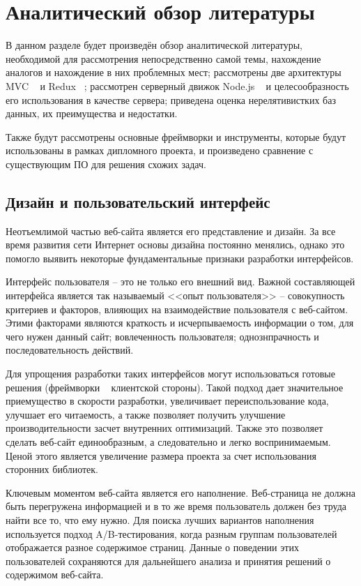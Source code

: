 \section{Аналитический обзор литературы}
\label{sec:domain}

В данном разделе будет произведён обзор аналитической литературы, необходимой для рассмотрения непосредственно самой темы, нахождение аналогов и нахождение в них проблемных мест; рассмотрены две архитектуры MVC ~\cite{mvc} и Redux ~\cite{redux}; рассмотрен серверный движок Node.js ~\cite{node_js} и целесообразность его использования в качестве сервера; приведена оценка нерелятивистких баз данных, их преимущества и недостатки.

Также будут рассмотрены основные фреймворки и инструменты, которые будут использованы в рамках дипломного проекта, и произведено сравнение с существующим ПО для решения схожих задач.

\subsection{Дизайн и пользовательский интерфейс}
\label{sub:domain:bayes_net}
Неотъемлимой частью веб-сайта является его представление и дизайн. За все время развития сети Интернет основы дизайна постоянно менялись, однако это помогло выявить некоторые фундаментальные признаки разработки интерфейсов.

Интерфейс пользователя -- это не только его внешний вид. Важной составляющей интерфейса является так называемый <<опыт пользователя>> -- совокупность критериев и факторов, влияющих на взаимодействие пользователя с веб-сайтом. Этими факторами являются краткость и исчерпываемость информации о том, для чего нужен данный сайт; вовлеченность пользователя; однознпрачность и последовательность действий.

Для упрощения разработки таких интерфейсов могут использоваться готовые решения (фреймворки ~\cite{framework} клиентской стороны). Такой подход дает значительное приемущество в скорости разработки, увеличивает переиспользование кода, улучшает его читаемость, а также позволяет получить улучшение производительности засчет внутренних оптимизаций. Также это позволяет сделать веб-сайт единообразным, а следовательно и легко воспринимаемым. Ценой этого является увеличение размера проекта за счет использования сторонних библиотек.

Ключевым моментом веб-сайта является его наполнение. Веб-страница не должна быть перегружена информацией и в то же время пользователь должен без труда найти все то, что ему нужно. Для поиска лучших вариантов наполнения используется подход A/B-тестирования, когда разным группам пользователей отображается разное содержимое страниц. Данные о поведении этих пользователей сохраняются для дальнейшего анализа и принятия решений о содержимом веб-сайта.

